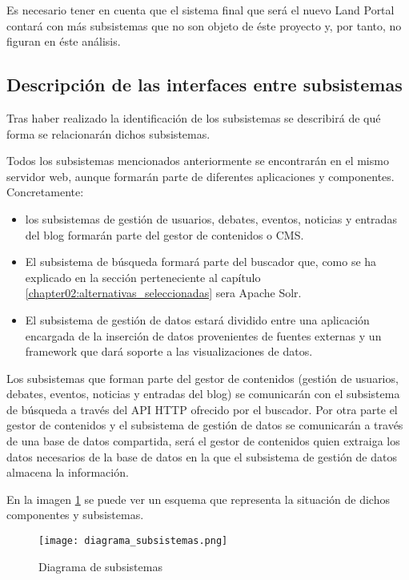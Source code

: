 Es necesario tener en cuenta que el sistema final que será el nuevo Land Portal contará con más subsistemas que no son objeto de éste proyecto y, por tanto, no figuran en éste análisis.


\subsection{Descripción de las interfaces entre subsistemas}
Tras haber realizado la identificación de los subsistemas  se describirá de qué forma se relacionarán dichos subsistemas.

Todos los subsistemas mencionados anteriormente se encontrarán en el mismo servidor web, aunque formarán parte de diferentes aplicaciones y componentes.  Concretamente:
\begin{itemize}
\item los subsistemas de gestión de usuarios, debates, eventos, noticias y entradas del blog formarán parte del gestor de contenidos o CMS.
\item El subsistema de búsqueda formará parte del buscador que, como se ha explicado en la sección  perteneciente al capítulo \ref{chapter02:alternativas_seleccionadas} sera Apache Solr.
\item El subsistema de gestión de datos estará dividido entre una aplicación encargada de la inserción de datos provenientes de fuentes externas y un framework que dará soporte a las visualizaciones de datos.
\end{itemize}

Los subsistemas que forman parte del gestor de contenidos (gestión de usuarios, debates, eventos, noticias y entradas del blog) se comunicarán con el subsistema de búsqueda a través del API HTTP ofrecido por el buscador. \newline
Por otra parte el gestor de contenidos y el subsistema de gestión de datos se comunicarán a través de una base de datos compartida, será el gestor de contenidos quien extraiga los datos necesarios de la base de datos en la que el subsistema de gestión de datos almacena la información.

En la imagen \ref{fig:diagrama_subsistemas} se puede ver un esquema que representa la situación de dichos componentes y subsistemas.

\begin{figure}[h]
\centering
\texttt{[image: diagrama\_subsistemas.png]}
\caption{Diagrama de subsistemas}
\label{fig:diagrama_subsistemas}
\end{figure}